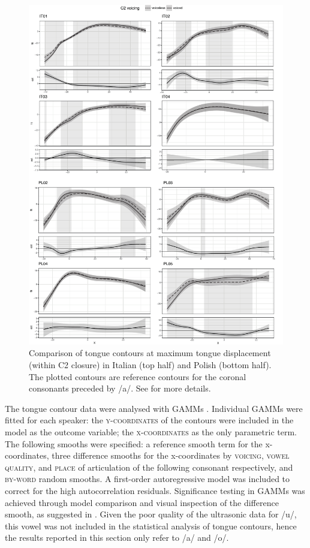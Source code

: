 \documentclass[authoryear, twocolumn]{elsarticle}
\begin{document}
\begin{figure}
    \centering
    \includegraphics[height=.9\textheight]{fig/tra.pdf}
    \caption{Comparison of tongue contours at maximum tongue displacement (within C2 closure) in Italian (top half) and Polish (bottom half). The plotted contours are reference contours for the coronal consonants preceded by /a/. See  for more details.}
    \label{f:tra}
\end{figure}

The tongue contour data were analysed with GAMMs \citep{wood2006}.
Individual GAMMs were fitted for each speaker: the
\textsc{y-coordinates} of the contours were included in the model as the
outcome variable; the \textsc{x-coordinates} as the only parametric
term. The following smooths were specified: a reference smooth term for
the x-coordinates, three difference smooths for the x-coordinates by
\textsc{voicing}, \textsc{vowel quality}, and \textsc{place} of
articulation of the following consonant respectively, and
\textsc{by-word} random smooths. A first-order autoregressive model was
included to correct for the high autocorrelation residuals. Significance
testing in GAMMs was achieved through model comparison and visual
inspection of the difference smooth, as suggested in
\citep{soskuthy2017}. Given the poor quality of the ultrasonic data for
/u/, this vowel was not included in the statistical analysis of tongue
contours, hence the results reported in this section only refer to /a/
and /o/.
\end{document}
